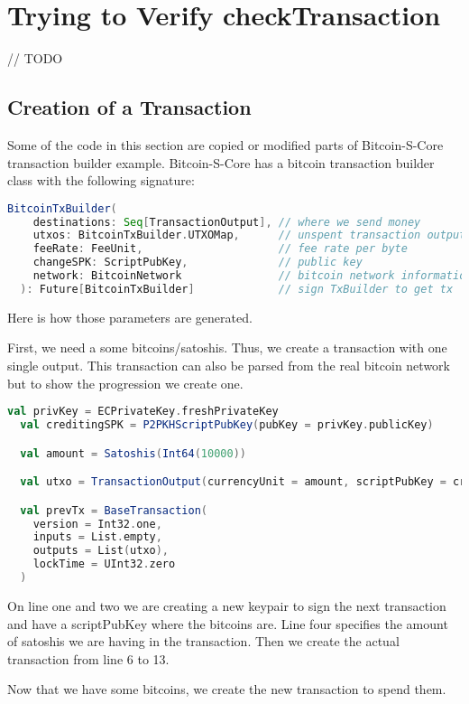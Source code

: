 \chapter{Trying to Verify checkTransaction}
\label{chap:connecting}
// TODO


\section{Creation of a Transaction}

Some of the code in this section are copied or modified parts of Bitcoin-S-Core transaction builder example.\cite{BitcoinSCore:txbuilderexample}
Bitcoin-S-Core has a bitcoin transaction builder class with the following signature:
\begin{lstlisting}[language=scala]
  BitcoinTxBuilder(
    destinations: Seq[TransactionOutput], // where we send money
    utxos: BitcoinTxBuilder.UTXOMap,      // unspent transaction outputs
    feeRate: FeeUnit,                     // fee rate per byte
    changeSPK: ScriptPubKey,              // public key
    network: BitcoinNetwork               // bitcoin network information
  ): Future[BitcoinTxBuilder]             // sign TxBuilder to get tx
\end{lstlisting}

Here is how those parameters are generated.

First, we need a some bitcoins/satoshis.
Thus, we create a transaction with one single output.
This transaction can also be parsed from the real bitcoin network but to show the progression we create one.
\begin{lstlisting}[language=scala]
  val privKey = ECPrivateKey.freshPrivateKey
  val creditingSPK = P2PKHScriptPubKey(pubKey = privKey.publicKey)

  val amount = Satoshis(Int64(10000))

  val utxo = TransactionOutput(currencyUnit = amount, scriptPubKey = creditingSPK)

  val prevTx = BaseTransaction(
    version = Int32.one,
    inputs = List.empty,
    outputs = List(utxo),
    lockTime = UInt32.zero
  )
\end{lstlisting}

On line one and two we are creating a new keypair to sign the next transaction and have a scriptPubKey where the bitcoins are.
Line four specifies the amount of satoshis we are having in the transaction.
Then we create the actual transaction from line 6 to 13.

Now that we have some bitcoins, we create the new transaction to spend them.

